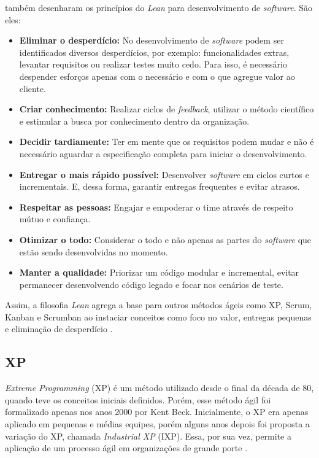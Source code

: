 \documentclass[
    12pt,       %
    openright,      %
    twoside,      %
    a4paper,      %
    english,      %
    french,       %
    spanish,      %
    brazil,       %
    ]{abntex2}
\begin{document}
 também desenharam os princípios do \textit{Lean} para desenvolvimento de \textit{software}. São eles:

\begin{itemize}
    \item \textbf{Eliminar o desperdício:} No desenvolvimento de \textit{software} podem ser identificados diversos desperdícios, por exemplo: funcionalidades extras, levantar requisitos ou realizar testes muito cedo. Para isso, é necessário despender esforços apenas com o necessário e com o que agregue valor ao cliente.
    \item \textbf{Criar conhecimento:} Realizar ciclos de \textit{feedback}, utilizar o método científico e estimular a busca por conhecimento dentro da organização. 
    \item \textbf{Decidir tardiamente:} Ter em mente que os requisitos podem mudar e não é necessário aguardar a especificação completa para iniciar o desenvolvimento.     
    \item \textbf{Entregar o mais rápido possível:} Desenvolver \textit{software} em ciclos curtos e incrementais. E, dessa forma, garantir entregas frequentes e evitar atrasos.
    \item \textbf{Respeitar as pessoas:} Engajar e empoderar o time através de respeito mútuo e confiança.
    \item \textbf{Otimizar o todo:} Considerar o todo e não apenas as partes do \textit{software} que estão sendo desenvolvidas no momento.
    \item \textbf{Manter a qualidade:} Priorizar um código modular e incremental, evitar permanecer desenvolvendo código legado e focar nos cenários de teste.
\end{itemize}

Assim, a filosofia \textit{Lean} agrega a base para outros métodos ágeis como XP, Scrum, Kanban e Scrumban ao instaciar conceitos como foco no valor, entregas pequenas e eliminação de desperdício \cite{PMIAGILE:2017}.

\subsection{XP}

\textit{Extreme Programming} (XP) é um método utilizado desde o final da década de 80, quando teve os conceitos iniciais definidos. Porém, esse método ágil foi formalizado apenas nos anos 2000 por Kent Beck. Inicialmente, o XP era apenas aplicado em pequenas e médias equipes, porém alguns anos depois foi proposta a variação do XP, chamada \textit{Industrial XP} (IXP). Essa, por sua vez, permite a aplicação de um processo ágil em organizações de grande porte \cite{PRESSMAN:2011}. 
\end{document}
